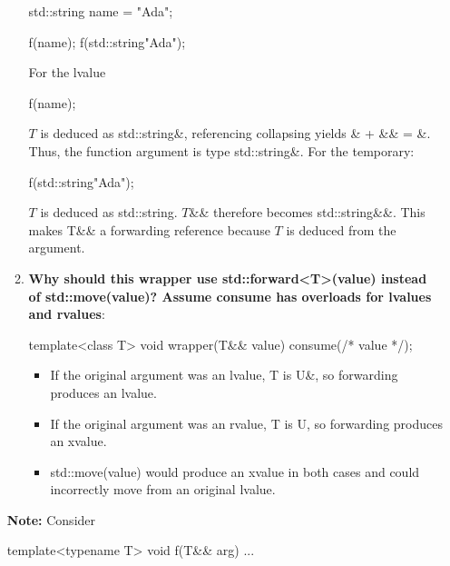 \documentclass{report}
\begin{document}
\begin{itemize}
\begin{enumerate}
\begin{cppcode}
                        std::string name = "Ada";

                        f(name);
                        f(std::string{"Ada"});
                    \end{cppcode}
                    \bigbreak \noindent 
                    For the lvalue
                    \bigbreak \noindent 
                    \begin{cppcode}
                    f(name);
                    \end{cppcode}
                    \bigbreak \noindent 
                    $T$ is deduced as std::string\&, referencing collapsing yields \& + \&\& = \&. Thus, the function argument is type std::string\&.
                    \bigbreak \noindent 
                    For the temporary:
                    \begin{cppcode}
                        f(std::string{"Ada"});
                    \end{cppcode}
                    \bigbreak \noindent 
                    $T$ is deduced as std::string. $T$\&\& therefore becomes std::string\&\&. This makes T\&\& a forwarding reference because $T$ is deduced from the argument.
                \item \textbf{Why should this wrapper use std::forward<T>(value) instead of std::move(value)? Assume consume has overloads for lvalues and rvalues}: 
                    \bigbreak \noindent 
                    \begin{cppcode}
                        template<class T>
                        void wrapper(T&& value) {
                            consume(/* value */);
                        }
                    \end{cppcode}
                    \begin{itemize}
                        \item If the original argument was an lvalue, T is U\&, so forwarding produces an lvalue.
                        \item If the original argument was an rvalue, T is U, so forwarding produces an xvalue.
                        \item std::move(value) would produce an xvalue in both cases and could incorrectly move from an original lvalue.
                    \end{itemize}
            \end{enumerate}
            \textbf{Note:} Consider
            \bigbreak \noindent 
            \begin{cppcode}
                template<typename T>
                void f(T&& arg) { ... }


\end{cppcode}
\end{itemize}
\end{document}
